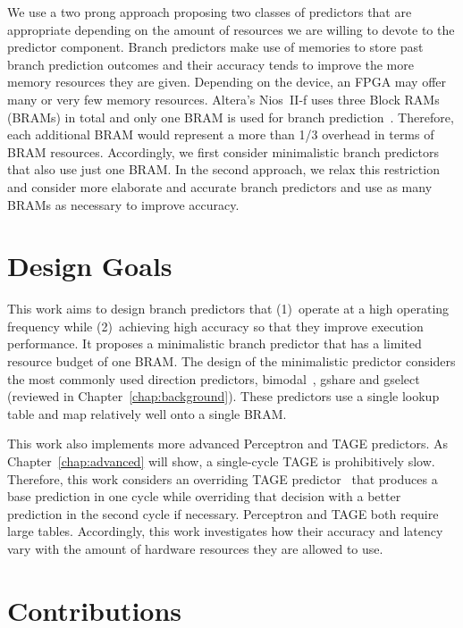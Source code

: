 We use a two prong approach proposing two classes of predictors that are appropriate depending on the amount of resources we are willing to devote to the predictor component. Branch predictors make use of memories to store past branch prediction outcomes and their accuracy tends to improve the more memory resources they are given. Depending on the device, an FPGA may offer many or very few memory resources. Altera's Nios~II-f uses three Block RAMs (BRAMs) in total and only one BRAM is used for branch prediction~\cite{niosiif}. Therefore, each additional BRAM would represent a more than 1/3 overhead in terms of BRAM resources. Accordingly, we first consider minimalistic branch predictors that also use just one BRAM. In the second approach, we relax this restriction and consider more elaborate and accurate branch predictors and use as many BRAMs as necessary to improve accuracy.

\section{Design Goals}
\label{sec:introduction:goal}

This work aims to design branch predictors that (1)~operate at a high operating frequency while (2)~achieving high accuracy so that they improve execution performance. It proposes a minimalistic branch predictor that has a limited resource budget of one BRAM. The design of the minimalistic predictor considers the most commonly used direction predictors, bimodal~\cite{bimodal}, gshare and gselect~\cite{McFarling} (reviewed in Chapter~\ref{chap:background}). These predictors use a single lookup table and map relatively well onto a single BRAM.

This work also implements more advanced Perceptron and TAGE predictors. As Chapter~\ref{chap:advanced} will show, a single-cycle TAGE is prohibitively slow. Therefore, this work considers an overriding TAGE predictor~\cite{override} that produces a base prediction in one cycle while overriding that decision with a better prediction in the second cycle if necessary. Perceptron and TAGE both require large tables. Accordingly, this work investigates how their accuracy and latency vary with the amount of hardware resources they are allowed to use.


\section{Contributions}
\label{sec:intro:contributions}


